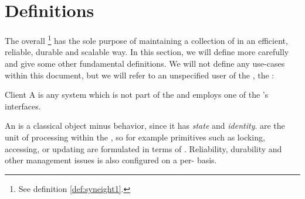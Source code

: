 \documentclass[a4paper, 12pt]{book}
\begin{document}


\section{Definitions}

The overall \SYNEIGHT\footnote{See definition \vref{def:syneight1}.}
has the sole purpose of maintaining a collection of  in an
efficient, reliable, durable and scalable way. In this section, we will
define \SYNEIGHT more carefully and give some other fundamental
definitions. We will not define any use-cases within this document, but we
will refer to an unspecified user of the \SYNEIGHT, the :

\begin{definition*}{Client}
  \label{def:client}
  A  is any system which is not part of the \SYNEIGHT and
  employs one of the \SYNEIGHT's interfaces.
\end{definition*}

An  is a classical object minus behavior, since it has
\emph{state} and \emph{identity}.  are the unit of
processing within the \SYNEIGHT, so for example primitives such
as locking, accessing, or updating are formulated in terms of
. Reliability, durability and other management issues is
also configured on a per- basis.

\newcommand{\defentitytext}{An \dt{entity} encapsulates an uninterpreted
  state and is a uniquely identifiable unit (within an
  \dt{entity-database}).}
\end{document}
